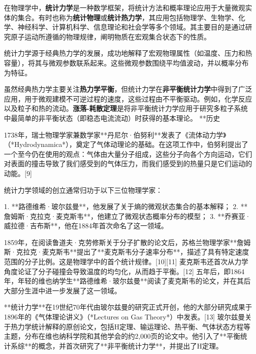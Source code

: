 

在物理学中，\textbf{统计力学}是一种数学框架，将统计方法和概率理论应用于大量微观实体的集合。有时也称为\textbf{统计物理}或\textbf{统计热力学}，其应用包括物理学、生物学、化学、神经科学、计算机科学、信息理论和社会学等多个领域。其主要目的是通过研究原子运动所遵循的物理规律，阐明物质在宏观集合状态下的性质。

统计力学源于经典热力学的发展，成功地解释了宏观物理属性（如温度、压力和热容量），将其与微观参数联系起来。这些微观参数围绕平均值波动，并以概率分布为特征。

虽然经典热力学主要关注\textbf{热力学平衡}，但统计力学在\textbf{非平衡统计力学}中得到了广泛应用，用于微观建模不可逆过程的速度，这些过程由不平衡驱动。例如，化学反应以及粒子和热的流动。\textbf{涨落-耗散定理}是将非平衡统计力学应用于研究多粒子系统中最简单的非平衡状态（即稳态电流流动）时获得的基本理论。
**历史

1738年，瑞士物理学家兼数学家**丹尼尔·伯努利**发表了《流体动力学》（*Hydrodynamica*），奠定了气体动理论的基础。在这项工作中，伯努利提出了一个至今仍在使用的观点：气体由大量分子组成，这些分子向各个方向运动，它们对表面的撞击导致了我们感受到的气体压力，而我们感受到的热量只是它们运动的动能。[9]

统计力学领域的创立通常归功于以下三位物理学家：

1. **路德维希·玻尔兹曼**，他发展了关于熵的微观状态集合的基本解释；
2. **詹姆斯·克拉克·麦克斯韦**，他建立了微观状态概率分布的模型；
3. **乔赛亚·威拉德·吉布斯**，他在1884年首次命名了这一领域。

1859年，在阅读鲁道夫·克劳修斯关于分子扩散的论文后，苏格兰物理学家**詹姆斯·克拉克·麦克斯韦**提出了**麦克斯韦分子速率分布**，描述了具有特定速度范围的分子比例。这是物理学中的首个统计规律。[10][11] 麦克斯韦还首次从力学角度论证了分子碰撞会导致温度的均匀化，从而趋于平衡。[12] 五年后，即1864年，年轻的维也纳学生**路德维希·玻尔兹曼**阅读了麦克斯韦的论文，并在其后大部分生涯中进一步发展了这一领域。

**统计力学**在19世纪70年代由玻尔兹曼的研究正式开创，他的大部分研究成果于1896年的《气体理论讲义》（*Lectures on Gas Theory*）中发表。[13] 玻尔兹曼关于热力学统计解释的原创论文，包括H定理、输运理论、热平衡、气体状态方程等主题，分布在维也纳科学院和其他学会的约2,000页的论文中。他引入了**平衡统计系综**的概念，并首次研究了**非平衡统计力学**，并提出了H定理。